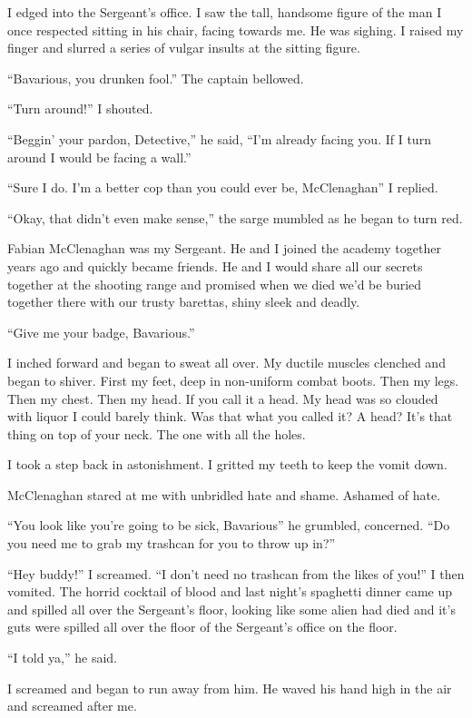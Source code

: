 I edged into the Sergeant's office. I saw the tall, handsome figure
of the man I once respected sitting in his chair, facing towards
me. He was sighing. I raised my finger and slurred a series of
vulgar insults at the sitting figure.

``Bavarious, you drunken fool.'' The captain bellowed.

``Turn around!'' I shouted.

``Beggin' your pardon, Detective,'' he said, ``I'm already facing you.
If I turn around I would be facing a wall.''

``Sure I do. I'm a better cop than you could ever be, McClenaghan'' I
replied.

``Okay, that didn't even make sense,'' the sarge mumbled as he began
to turn red.

Fabian McClenaghan was my Sergeant. He and I joined the academy
together years ago and quickly became friends. He and I would share
all our secrets together at the shooting range and promised when we
died we'd be buried together there with our trusty barettas, shiny
sleek and deadly.

``Give me your badge, Bavarious.''

I inched forward and began to sweat all over. My ductile muscles
clenched and began to shiver. First my feet, deep in non-uniform
combat boots. Then my legs. Then my chest. Then my head. If you
call it a head. My head was so clouded with liquor I could barely
think. Was that what you called it? A head? It's that thing on top
of your neck. The one with all the holes.

I took a step back in astonishment. I gritted my teeth to keep the
vomit down.

McClenaghan stared at me with unbridled hate and shame. Ashamed of
hate.

``You look like you're going to be sick, Bavarious'' he grumbled,
concerned. ``Do you need me to grab my trashcan for you to throw up
in?''

``Hey buddy!'' I screamed. ``I don't need no trashcan from the likes
of you!'' I then vomited. The horrid cocktail of blood and last
night's spaghetti dinner came up and spilled all over the
Sergeant's floor, looking like some alien had died and it's guts
were spilled all over the floor of the Sergeant's office on the
floor.

``I told ya,'' he said.

I screamed and began to run away from him. He waved his hand high
in the air and screamed after me.

